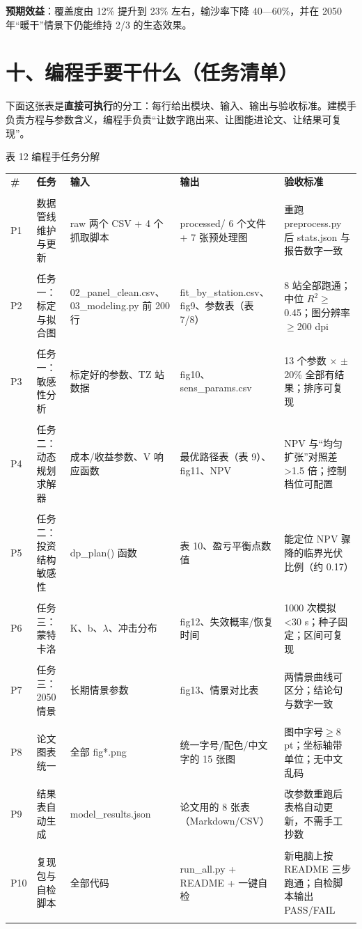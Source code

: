 \documentclass[11pt,a4paper]{ctexart}
\begin{document}
\textbf{预期效益}：覆盖度由 12\% 提升到 23\% 左右，输沙率下降 40—60\%，并在 2050 年“暖干”情景下仍能维持 2/3 的生态效果。


\section*{十、编程手要干什么（任务清单）}
下面这张表是\textbf{直接可执行}的分工：每行给出模块、输入、输出与验收标准。建模手负责方程与参数含义，编程手负责“让数字跑出来、让图能进论文、让结果可复现”。

表 12  编程手任务分解


\begin{table}[H]\centering\small\setlength{\parskip}{2pt}
\begin{tabularx}{\textwidth}{|X|X|X|X|X|}
\toprule
\textbf{\#} & \textbf{任务} & \textbf{输入} & \textbf{输出} & \textbf{验收标准} \\\\
\midrule
P1 & 数据管线维护与更新 & raw 两个 CSV + 4 个抓取脚本 & processed/ 6 个文件 + 7 张预处理图 & 重跑 preprocess.py 后 stats.json 与报告数字一致 \\\\
P2 & 任务一：标定与拟合图 & 02\_panel\_clean.csv、03\_modeling.py 前 200 行 & fit\_by\_station.csv、fig9、参数表（表 7/8） & 8 站全部跑通；中位 $R^{2}$$\ge$0.45；图分辨率$\ge$200 dpi \\\\
P3 & 任务一：敏感性分析 & 标定好的参数、TZ 站数据 & fig10、sens\_params.csv & 13 个参数 $\times$ $\pm$20\% 全部有结果；排序可复现 \\\\
P4 & 任务二：动态规划求解器 & 成本/收益参数、V 响应函数 & 最优路径表（表 9）、fig11、NPV & NPV 与“均匀扩张”对照差 >1.5 倍；控制档位可配置 \\\\
P5 & 任务二：投资结构敏感性 & dp\_plan() 函数 & 表 10、盈亏平衡点数值 & 能定位 NPV 骤降的临界光伏比例（约 0.17） \\\\
P6 & 任务三：蒙特卡洛 & K、b、${\lambda}$、冲击分布 & fig12、失效概率/恢复时间 & 1000 次模拟 <30 s；种子固定；区间可复现 \\\\
P7 & 任务三：2050 情景 & 长期情景参数 & fig13、情景对比表 & 两情景曲线可区分；结论句与数字一致 \\\\
P8 & 论文图表统一 & 全部 fig*.png & 统一字号/配色/中文字的 15 张图 & 图中字号$\ge$8 pt；坐标轴带单位；无中文乱码 \\\\
P9 & 结果表自动生成 & model\_results.json & 论文用的 8 张表（Markdown/CSV） & 改参数重跑后表格自动更新，不需手工抄数 \\\\
P10 & 复现包与自检脚本 & 全部代码 & run\_all.py + README + 一键自检 & 新电脑上按 README 三步跑通；自检脚本输出 PASS/FAIL \\\\
\bottomrule
\end{tabularx}
\end{table}
\end{document}
